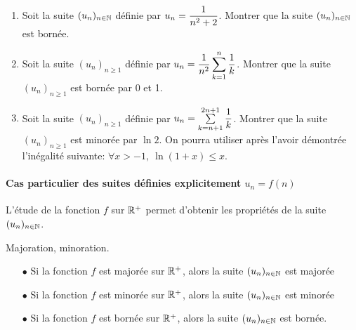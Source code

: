 \documentclass[a4paper, 11pt]{article}
\begin{document}
{\footnotesize 
\begin{exercice}
\begin{enumerate}
\item Soit la suite $(u_n)_{n\in \mathbb{N}}$ d\'efinie par $\displaystyle u_n=\frac{1}{n^2+2}$. Montrer que la suite $(u_n)_{n\in \mathbb{N}}$ est born\'ee.%
\item Soit la suite $(u_n)_{n\geq 1}$ d\'efinie par $u_n=\displaystyle\frac{1}{n^2}\sum\limits_{k=1}^n \displaystyle\frac{1}{k}$. Montrer que la suite $(u_n)_{n\geq 1}$ est born\'ee par $0$ et 1.
\item Soit la suite $(u_n)_{n\geq 1}$ d\'efinie par $u_n=\sum\limits_{k=n+1}^{2n+1} \displaystyle\frac{1}{k}$. Montrer que la suite $(u_n)_{n\geq 1}$ est minor\'ee par $\ln{2}$. On pourra utiliser apr\`{e}s l'avoir d\'emontr\'ee l'in\'egalit\'e suivante: $\forall x>-1, \ \ln{(1+x)}\leq x$.
\end{enumerate}
\end{exercice}}


\paragraph{Cas particulier des suites d\'efinies explicitement  $u_n = f(n)$}

 L'\'etude de la fonction $f$ sur $\mathbb{R}^+$ permet d'obtenir les propri\'et\'es de la suite $(u_n)_{n\in \mathbb{N}}$. \vspace{0.3cm}\\



\begin{prop} Majoration, minoration.
\begin{itemize}
\item[$\bullet$] Si la fonction $f$ est major\'ee sur $\mathbb{R}^+$, alors la suite $(u_n)_{n\in \mathbb{N}}$ est majorée
\item[$\bullet$] Si la fonction $f$ est minor\'ee sur $\mathbb{R}^+$, alors la suite $(u_n)_{n\in \mathbb{N}}$ est minorée
\item[$\bullet$] Si la fonction $f$ est born\'ee sur $\mathbb{R}^+$, alors la suite $(u_n)_{n\in \mathbb{N}}$ est bornée. 
\end{itemize}
\end{prop}

\end{document}
